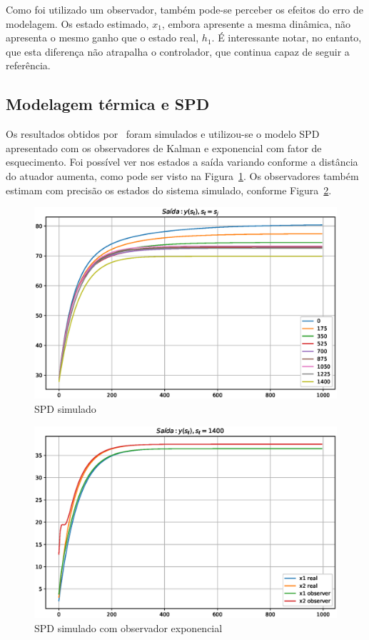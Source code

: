 Como foi utilizado um observador, também pode-se perceber os efeitos do erro de
modelagem. Os estado estimado, \( x_1 \), embora apresente a mesma dinâmica, não
apresenta o mesmo ganho que o estado real, \( h_1 \). É interessante notar, no
entanto, que esta diferença não atrapalha o controlador, que continua capaz de
seguir a referência.

\subsection{Modelagem térmica e SPD}%
\label{subsec:spd-studies}

Os resultados obtidos por~\textcite{masterthesis:nelson} foram simulados e
utilizou-se o modelo \ac{SPD} apresentado com os observadores de Kalman e
exponencial com fator de esquecimento. Foi possível ver nos estados a saída
variando conforme a distância do atuador aumenta, como pode ser visto na
Figura~\ref{fig:spd-sim}. Os observadores também estimam com precisão os estados
do sistema simulado, conforme Figura~\ref{fig:spd-obs}.

\begin{figure}[ht!]
    \centering
    \captionsetup{justification=centering}
    \includegraphics[height=0.5\linewidth]{imgs/spd-sim}
    \caption{SPD simulado}%
    \label{fig:spd-sim}
\end{figure}

\begin{figure}[ht!]
    \centering
    \captionsetup{justification=centering}
    \includegraphics[height=0.5\linewidth]{imgs/spd-obs}
    \caption{SPD simulado com observador exponencial}%
    \label{fig:spd-obs}
\end{figure}


